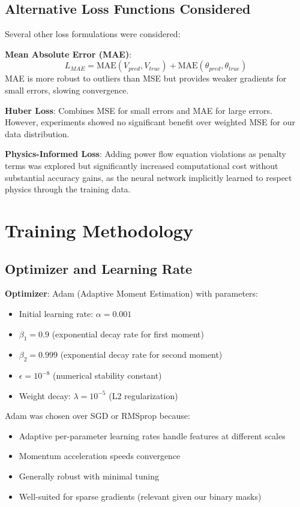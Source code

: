 \documentclass[12pt,a4paper]{report}
\begin{document}
\subsection{Alternative Loss Functions Considered}

Several other loss formulations were considered:

\textbf{Mean Absolute Error (MAE)}:
\begin{equation}
    L_{MAE} = \text{MAE}(V_{pred}, V_{true}) + \text{MAE}(\theta_{pred}, \theta_{true})
\end{equation}
MAE is more robust to outliers than MSE but provides weaker gradients for small errors, slowing convergence.

\textbf{Huber Loss}: Combines MSE for small errors and MAE for large errors. However, experiments showed no significant benefit over weighted MSE for our data distribution.

\textbf{Physics-Informed Loss}: Adding power flow equation violations as penalty terms was explored but significantly increased computational cost without substantial accuracy gains, as the neural network implicitly learned to respect physics through the training data.

\section{Training Methodology}

\subsection{Optimizer and Learning Rate}

\textbf{Optimizer}: Adam (Adaptive Moment Estimation) with parameters:
\begin{itemize}
    \item Initial learning rate: $\alpha = 0.001$
    \item $\beta_1 = 0.9$ (exponential decay rate for first moment)
    \item $\beta_2 = 0.999$ (exponential decay rate for second moment)
    \item $\epsilon = 10^{-8}$ (numerical stability constant)
    \item Weight decay: $\lambda = 10^{-5}$ (L2 regularization)
\end{itemize}

Adam was chosen over SGD or RMSprop because:
\begin{itemize}
    \item Adaptive per-parameter learning rates handle features at different scales
    \item Momentum acceleration speeds convergence
    \item Generally robust with minimal tuning
    \item Well-suited for sparse gradients (relevant given our binary masks)
\end{itemize}
\end{document}

